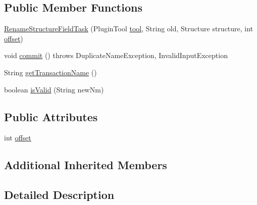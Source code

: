 \subsection*{Public Member Functions}
\begin{DoxyCompactItemize}
\item 
\mbox{\hyperlink{classghidra_1_1app_1_1plugin_1_1core_1_1decompile_1_1actions_1_1_rename_structure_field_task_a1886a3c69ed6b99cc7416c346f27f8d6}{Rename\+Structure\+Field\+Task}} (Plugin\+Tool \mbox{\hyperlink{classghidra_1_1app_1_1plugin_1_1core_1_1decompile_1_1actions_1_1_rename_task_aded3c0474f9fa5697b5b550bc2709597}{tool}}, String old, Structure structure, int \mbox{\hyperlink{classghidra_1_1app_1_1plugin_1_1core_1_1decompile_1_1actions_1_1_rename_structure_field_task_a519575d0203f600bad15c05880fb3353}{offset}})
\item 
void \mbox{\hyperlink{classghidra_1_1app_1_1plugin_1_1core_1_1decompile_1_1actions_1_1_rename_structure_field_task_a44098f68d36318310d54b69dd0785ce2}{commit}} ()  throws Duplicate\+Name\+Exception, Invalid\+Input\+Exception 
\item 
String \mbox{\hyperlink{classghidra_1_1app_1_1plugin_1_1core_1_1decompile_1_1actions_1_1_rename_structure_field_task_ade92e756fc36a0c313376d6ca96d3702}{get\+Transaction\+Name}} ()
\item 
boolean \mbox{\hyperlink{classghidra_1_1app_1_1plugin_1_1core_1_1decompile_1_1actions_1_1_rename_structure_field_task_afdae75e6a7eb73912174c98cb733be35}{is\+Valid}} (String new\+Nm)
\end{DoxyCompactItemize}
\subsection*{Public Attributes}
\begin{DoxyCompactItemize}
\item 
int \mbox{\hyperlink{classghidra_1_1app_1_1plugin_1_1core_1_1decompile_1_1actions_1_1_rename_structure_field_task_a519575d0203f600bad15c05880fb3353}{offset}}
\end{DoxyCompactItemize}
\subsection*{Additional Inherited Members}


\subsection{Detailed Description}


